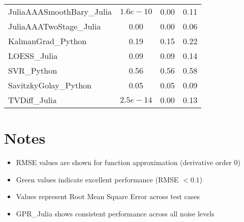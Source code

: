 \documentclass[11pt]{article}
\begin{document}
\begin{center}
\begin{tabular}{@{}l|ccc@{}}
JuliaAAASmoothBary\_Julia & \textcolor{successgreen}{$1.6e-10$} & \textcolor{successgreen}{0.00} & 0.11 \\
JuliaAAATwoStage\_Julia & \textcolor{successgreen}{0.00} & \textcolor{successgreen}{0.00} & \textcolor{successgreen}{0.06} \\
KalmanGrad\_Python & 0.19 & 0.15 & 0.22 \\
LOESS\_Julia & \textcolor{successgreen}{0.09} & \textcolor{successgreen}{0.09} & 0.14 \\
SVR\_Python & 0.56 & 0.56 & 0.58 \\
SavitzkyGolay\_Python & \textcolor{successgreen}{0.05} & \textcolor{successgreen}{0.05} & \textcolor{successgreen}{0.09} \\
TVDiff\_Julia & \textcolor{successgreen}{$2.5e-14$} & \textcolor{successgreen}{0.00} & 0.13 \\
\bottomrule
\end{tabular}
\end{center}

\section{Notes}
\begin{itemize}
\item RMSE values are shown for function approximation (derivative order 0)
\item \textcolor{successgreen}{Green values} indicate excellent performance (RMSE $< 0.1$)
\item Values represent Root Mean Square Error across test cases
\item GPR\_Julia shows consistent performance across all noise levels
\end{itemize}
\end{document}
